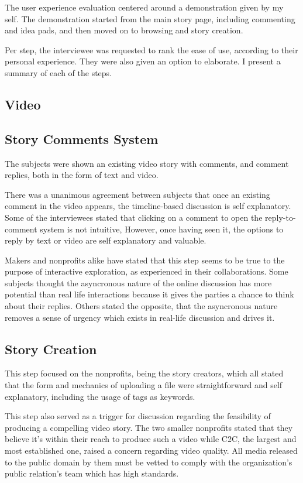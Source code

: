 The user experience evaluation centered around a demonstration given by my self. The demonstration started from the main story page, including commenting and idea pads, and then moved on to browsing and story creation. 


Per step, the interviewee was requested to rank the ease of use, according to their personal experience. They were also given an option to elaborate. I present a summary of each of the steps.

\subsection{Video}

\subsection{Story Comments System}

The subjects were shown an existing video story with comments, and comment replies, both in the form of text and video.

There was a unanimous agreement between subjects that once an existing comment in the video appears, the timeline-based discussion is self explanatory. Some of the interviewees stated that clicking on a comment to open the reply-to-comment system is not intuitive, However, once having seen it, the options to reply by text or video are self explanatory and valuable.

Makers and nonprofits alike have stated that this step seems to be true to the purpose of interactive exploration, as experienced in their collaborations. Some subjects thought the asyncronous nature of the online discussion has more potential than real life interactions because it gives the parties a chance to think about their replies. Others stated the opposite, that the asyncronous nature removes a sense of urgency which exists in real-life discussion and drives it. 

\subsection{Story Creation}

This step focused on the nonprofits, being the story creators, which all stated that the form and mechanics of uploading a file were straightforward and self explanatory, including the usage of tags as keywords. 

This step also served as a trigger for discussion regarding the feasibility of producing a compelling video story. The two smaller nonprofits stated that they believe it's within their reach to produce such a video while C2C, the largest and most established one, raised a concern regarding video quality. All media released to the public domain by them must be vetted to comply with the organization's public relation's team which has high standards.   

